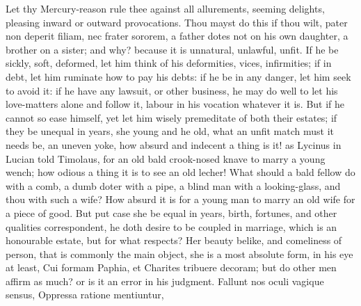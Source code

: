 {Let thy Mercury-reason rule thee against all allurements, seeming
delights, pleasing inward or outward provocations. Thou mayst do this
if thou wilt, pater non deperit filiam, nec frater sororem, a father
dotes not on his own daughter, a brother on a sister; and why? because
it is unnatural, unlawful, unfit. If he be sickly, soft, deformed, let
him think of his deformities, vices, infirmities; if in debt, let him
ruminate how to pay his debts: if he be in any danger, let him seek to
avoid it: if he have any lawsuit, or other business, he may do well to
let his love-matters alone and follow it, labour in his vocation
whatever it is. But if he cannot so ease himself, yet let him wisely
premeditate of both their estates; if they be unequal in years, she
young and he old, what an unfit match must it needs be, an uneven yoke,
how absurd and indecent a thing is it! as Lycinus in Lucian told
Timolaus, for an old bald crook-nosed knave to marry a young wench; how
odious a thing it is to see an old lecher! What should a bald fellow do
with a comb, a dumb doter with a pipe, a blind man with a
looking-glass, and thou with such a wife? How absurd it is for a young
man to marry an old wife for a piece of good. But put case she be equal
in years, birth, fortunes, and other qualities correspondent, he doth
desire to be coupled in marriage, which is an honourable estate, but
for what respects? Her beauty belike, and comeliness of person, that is
commonly the main object, she is a most absolute form, in his eye at
least, Cui formam Paphia, et Charites tribuere decoram; but do other
men affirm as much? or is it an error in his judgment.
Fallunt nos oculi vagique sensus,
Oppressa ratione mentiuntur,

}
